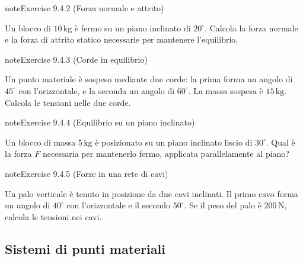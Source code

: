 \documentclass[letterpaper,10pt,italian]{jupyterBook}
\begin{document}
\begin{sphinxadmonition}{note}{Exercise 9.4.2 (Forza normale e attrito)}



\sphinxAtStartPar
Un blocco di \(10 \, \text{kg}\) è fermo su un piano inclinato di \(20^\circ\). Calcola la forza normale e la forza di attrito statico necessarie per mantenere l’equilibrio.
\end{sphinxadmonition}
 \label{exercise:ch/mechanics/statics-problems-exercise-2}

\begin{sphinxadmonition}{note}{Exercise 9.4.3 (Corde in equilibrio)}



\sphinxAtStartPar
Un punto materiale è sospeso mediante due corde: la prima forma un angolo di \(45^\circ\) con l’orizzontale, e la seconda un angolo di \(60^\circ\). La massa sospesa è \(15 \, \text{kg}\). Calcola le tensioni nelle due corde.
\end{sphinxadmonition}
 \label{exercise:ch/mechanics/statics-problems-exercise-3}

\begin{sphinxadmonition}{note}{Exercise 9.4.4 (Equilibrio su un piano inclinato)}



\sphinxAtStartPar
Un blocco di massa \(5 \, \text{kg}\) è posizionato su un piano inclinato liscio di \(30^\circ\). Qual è la forza \(F\) necessaria per mantenerlo fermo, applicata parallelamente al piano?
\end{sphinxadmonition}
 \label{exercise:ch/mechanics/statics-problems-exercise-4}

\begin{sphinxadmonition}{note}{Exercise 9.4.5 (Forze in una rete di cavi)}



\sphinxAtStartPar
Un palo verticale è tenuto in posizione da due cavi inclinati. Il primo cavo forma un angolo di \(40^\circ\) con l’orizzontale e il secondo \(50^\circ\). Se il peso del palo è \(200 \, \text{N}\), calcola le tensioni nei cavi.
\end{sphinxadmonition}


\subsection{Sistemi di punti materiali}
\label{\detokenize{ch/mechanics/statics-problems:sistemi-di-punti-materiali}} \label{exercise:ch/mechanics/statics-problems-exercise-5}
\end{document}
